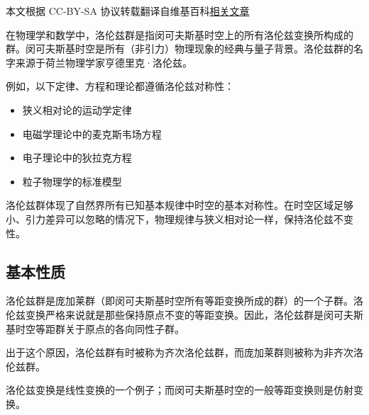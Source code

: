 
本文根据 CC-BY-SA 协议转载翻译自维基百科\href{https://en.wikipedia.org/wiki/Lorentz_group}{相关文章}

在物理学和数学中，洛伦兹群是指闵可夫斯基时空上的所有洛伦兹变换所构成的群。闵可夫斯基时空是所有（非引力）物理现象的经典与量子背景。洛伦兹群的名字来源于荷兰物理学家亨德里克·洛伦兹。

例如，以下定律、方程和理论都遵循洛伦兹对称性：
\begin{itemize}
\item 狭义相对论的运动学定律
\item 电磁学理论中的麦克斯韦场方程
\item 电子理论中的狄拉克方程
\item 粒子物理学的标准模型
\end{itemize}
洛伦兹群体现了自然界所有已知基本规律中时空的基本对称性。在时空区域足够小、引力差异可以忽略的情况下，物理规律与狭义相对论一样，保持洛伦兹不变性。
\subsection{基本性质}
洛伦兹群是庞加莱群（即闵可夫斯基时空所有等距变换所成的群）的一个子群。洛伦兹变换严格来说就是那些保持原点不变的等距变换。因此，洛伦兹群是闵可夫斯基时空等距群关于原点的各向同性子群。

出于这个原因，洛伦兹群有时被称为齐次洛伦兹群，而庞加莱群则被称为非齐次洛伦兹群。

洛伦兹变换是线性变换的一个例子；而闵可夫斯基时空的一般等距变换则是仿射变换。

